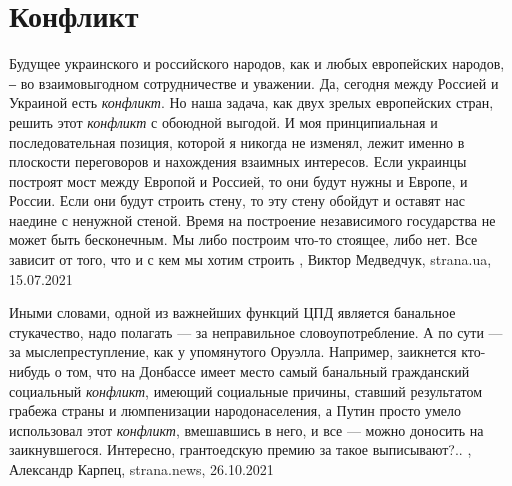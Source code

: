  
 
 
 
 
\chapter{Конфликт}
\label{sec:slova.konflikt}

Будущее украинского и российского народов, как и любых европейских народов, ‒
во взаимовыгодном сотрудничестве и уважении. Да, сегодня между Россией и
Украиной есть \emph{конфликт}. Но наша задача, как двух зрелых европейских стран,
решить этот \emph{конфликт} с обоюдной выгодой. И моя принципиальная и
последовательная позиция, которой я никогда не изменял, лежит именно в
плоскости переговоров и нахождения взаимных интересов. Если украинцы построят
мост между Европой и Россией, то они будут нужны и Европе, и России. Если они
будут строить стену, то эту стену обойдут и оставят нас наедине с ненужной
стеной. Время на построение независимого государства не может быть бесконечным.
Мы либо построим что-то стоящее, либо нет. Все зависит от того, что и с кем мы
хотим строить
, 
Виктор Медведчук, strana.ua, 15.07.2021

Иными словами, одной из важнейших функций ЦПД является банальное стукачество,
надо полагать — за неправильное словоупотребление. А по сути — за
мыслепреступление, как у упомянутого Оруэлла. Например, заикнется кто-нибудь о
том, что на Донбассе имеет место самый банальный гражданский социальный
\emph{конфликт}, имеющий социальные причины, ставший результатом грабежа страны и
люмпенизации народонаселения, а Путин просто умело использовал этот \emph{конфликт},
вмешавшись в него, и все — можно доносить на заикнувшегося. Интересно,
грантоедскую премию за такое выписывают?..
, 
Александр Карпец, strana.news, 26.10.2021
